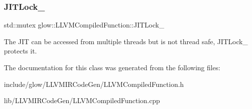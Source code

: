 \subsubsection{\texorpdfstring{J\+I\+T\+Lock\+\_\+}{JITLock\_}}
{\footnotesize\ttfamily std\+::mutex glow\+::\+L\+L\+V\+M\+Compiled\+Function\+::\+J\+I\+T\+Lock\+\_\+\hspace{0.3cm}{\ttfamily [protected]}}

The J\+IT can be accessed from multiple threads but is not thread safe, J\+I\+T\+Lock\+\_\+ protects it. 

The documentation for this class was generated from the following files\+:\begin{DoxyCompactItemize}
\item 
include/glow/\+L\+L\+V\+M\+I\+R\+Code\+Gen/L\+L\+V\+M\+Compiled\+Function.\+h\item 
lib/\+L\+L\+V\+M\+I\+R\+Code\+Gen/L\+L\+V\+M\+Compiled\+Function.\+cpp\end{DoxyCompactItemize}
